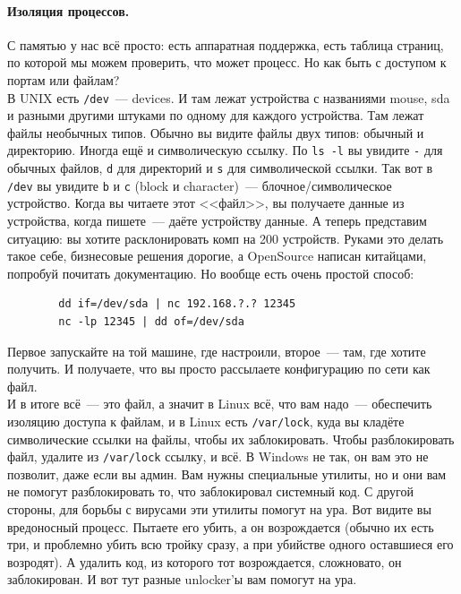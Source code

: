 \documentclass{article}
\begin{document}
    \paragraph{Изоляция процессов.}
    С памятью у нас всё просто: есть аппаратная поддержка, есть таблица страниц, по которой мы можем проверить, что может процесс. Но как быть с доступом к портам или файлам?\\
    В UNIX есть \texttt{/dev}~--- devices. И там лежат устройства с названиями mouse, sda и разными другими штуками по одному для каждого устройства. Там лежат файлы необычных типов. Обычно вы видите файлы двух типов: обычный и директорию. Иногда ещё и символическую ссылку. По \texttt{ls -l} вы увидите \texttt{-} для обычных файлов, \texttt{d} для директорий и \texttt{s} для символической ссылки. Так вот в \texttt{/dev} вы увидите \texttt{b} и \texttt{c} (block и character)~--- блочное/символическое устройство. Когда вы читаете этот <<файл>>, вы получаете данные из устройства, когда пишете~--- даёте устройству данные. А теперь представим ситуацию: вы хотите расклонировать комп на 200 устройств. Руками это делать такое себе, бизнесовые решения дорогие, а OpenSource написан китайцами, попробуй почитать документацию. Но вообще есть очень простой способ:
    \begin{verbatim}
        dd if=/dev/sda | nc 192.168.?.? 12345
        nc -lp 12345 | dd of=/dev/sda
    \end{verbatim}
    Первое запускайте на той машине, где настроили, второе~--- там, где хотите получить. И получаете, что вы просто рассылаете конфигурацию по сети как файл.\\
    И в итоге всё~--- это файл, а значит в Linux всё, что вам надо~--- обеспечить изоляцию доступа к файлам, и в Linux есть \texttt{/var/lock}, куда вы кладёте символические ссылки на файлы, чтобы их заблокировать. Чтобы разблокировать файл, удалите из \texttt{/var/lock} ссылку, и всё. В Windows не так, он вам это не позволит, даже если вы админ. Вам нужны специальные утилиты, но и они вам не помогут разблокировать то, что заблокировал системный код. С другой стороны, для борьбы с вирусами эти утилиты помогут на ура. Вот видите вы вредоносный процесс. Пытаете его убить, а он возрождается (обычно их есть три, и проблемно убить всю тройку сразу, а при убийстве одного оставшиеся его возродят). А удалить код, из которого тот возрождается, сложновато, он заблокирован. И вот тут разные unlocker'ы вам помогут на ура.
\end{document}
